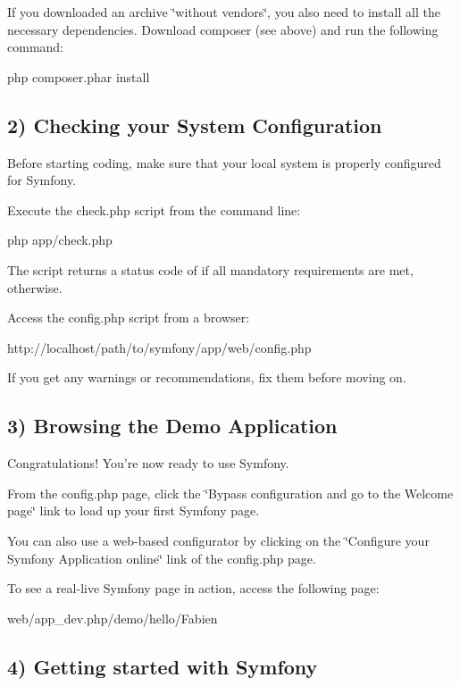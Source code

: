 If you downloaded an archive \char`\"{}without vendors\char`\"{}, you also need to install all the necessary dependencies. Download composer (see above) and run the following command\+: \begin{DoxyVerb}php composer.phar install
\end{DoxyVerb}


\subsection*{2) Checking your System Configuration }

Before starting coding, make sure that your local system is properly configured for Symfony.

Execute the {\ttfamily check.\+php} script from the command line\+: \begin{DoxyVerb}php app/check.php
\end{DoxyVerb}


The script returns a status code of {} if all mandatory requirements are met, {} otherwise.

Access the {\ttfamily config.\+php} script from a browser\+: \begin{DoxyVerb}http://localhost/path/to/symfony/app/web/config.php
\end{DoxyVerb}


If you get any warnings or recommendations, fix them before moving on.

\subsection*{3) Browsing the Demo Application }

Congratulations! You're now ready to use Symfony.

From the {\ttfamily config.\+php} page, click the \char`\"{}\+Bypass configuration and go to the
\+Welcome page\char`\"{} link to load up your first Symfony page.

You can also use a web-\/based configurator by clicking on the \char`\"{}\+Configure your
\+Symfony Application online\char`\"{} link of the {\ttfamily config.\+php} page.

To see a real-\/live Symfony page in action, access the following page\+: \begin{DoxyVerb}web/app_dev.php/demo/hello/Fabien
\end{DoxyVerb}


\subsection*{4) Getting started with Symfony }

